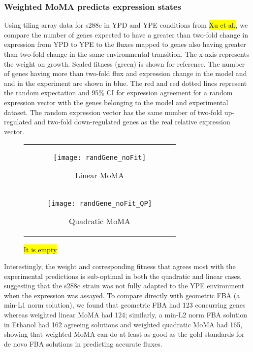 \subsubsection{Weighted MoMA predicts expression states}

Using tiling array data for s288c in YPD and YPE conditions from
\hl{Xu et al.}, we compare the number of genes expected to have a
greater than two-fold change in expression from YPD to YPE to the fluxes
mapped to genes also having greater than two-fold change in the same
environmental transition. The x-axis represents the weight on
growth. Scaled fitness (green) is shown for reference. The number of
genes having more than two-fold flux and expression change in the model and and
in the experiment are shown in blue. The red and red dotted lines
represent the random expectation and 95\% CI for expression agreement
for a random expression vector with the genes belonging to the model
and experimental dataset. The random expression vector has the same
number of two-fold up-regulated and two-fold down-regulated genes as the
real relative expression vector.

\begin{figure}
\centering
\begin{tabular}{c}
\begin{subfigure}[b]{\textwidth}
  \texttt{[image: randGene\_noFit]}
  \caption{Linear MoMA} 
  \label{fig:randGene_noFit}
\end{subfigure}
\\
\begin{subfigure}[b]{\textwidth}
  \texttt{[image: randGene\_noFit\_QP]}
  \caption{Quadratic MoMA} 
  \label{fig:randGene_noFit_QP}
\end{subfigure}
\\
\end{tabular}
\caption{\hl{It is empty}} 
\label{fig:wMoMA_expMatch}
\end{figure}


Interestingly, the weight and corresponding fitness that agrees most
with the experimental predictions is sub-optimal in both the quadratic
and linear cases, suggesting that the s288c strain was not fully
adapted to the YPE environment when the expression was assayed.  To
compare directly with geometric FBA (a min-L1 norm solution), we found
that geometric FBA had 123 concurring genes whereas weighted linear
MoMA had 124; similarly, a min-L2 norm FBA solution in Ethanol had 162
agreeing solutions and weighted quadratic MoMA had 165, showing that
weighted MoMA can do at least as good as the gold standards for de
novo FBA solutions in predicting accurate fluxes.


